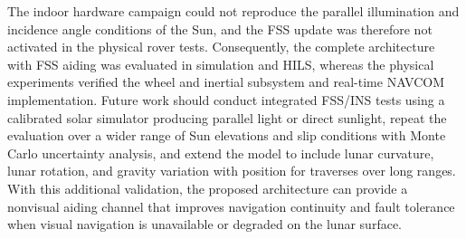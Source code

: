 \documentclass[]{IAC_style}
\begin{document}
The indoor hardware campaign could not reproduce the parallel illumination and incidence angle conditions of the Sun, and the FSS update was therefore not activated in the physical rover tests. Consequently, the complete architecture with FSS aiding was evaluated in simulation and HILS, whereas the physical experiments verified the wheel and inertial subsystem and real-time NAVCOM implementation. Future work should conduct integrated FSS/INS tests using a calibrated solar simulator producing parallel light or direct sunlight, repeat the evaluation over a wider range of Sun elevations and slip conditions with Monte Carlo uncertainty analysis, and extend the model to include lunar curvature, lunar rotation, and gravity variation with position for traverses over long ranges. With this additional validation, the proposed architecture can provide a nonvisual aiding channel that improves navigation continuity and fault tolerance when visual navigation is unavailable or degraded on the lunar surface.


\end{document}
